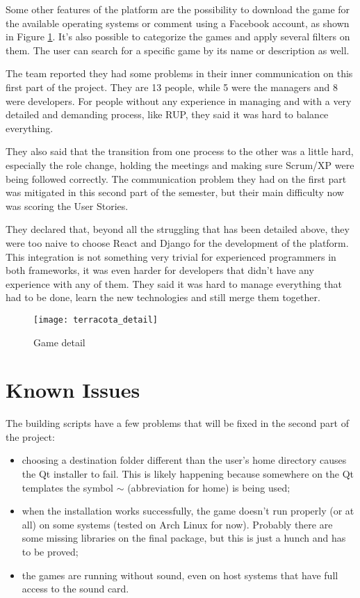 Some other features of the platform are the possibility to download the game for the available operating systems or comment using a Facebook account, as shown in Figure \ref{fig:game_detail}. It's also possible to categorize the games and apply several filters on them. The user can search for a specific game by its name or description as well.

The team reported they had some problems in their inner communication on this first part of the project. They are 13 people, while 5 were the managers and 8 were developers. For people without any experience in managing and with a very detailed and demanding process, like RUP, they said it was hard to balance everything.

They also said that the transition from one process to the other was a little hard, especially the role change, holding the meetings and making sure Scrum/XP were being followed correctly. The communication problem they had on the first part was mitigated in this second part of the semester, but their main difficulty now was scoring the User Stories.

They declared that, beyond all the struggling that has been detailed above, they were too naive to choose React and Django for the development of the platform. This integration is not something very trivial for experienced programmers in both frameworks, it was even harder for developers that didn't have any experience with any of them. They said it was hard to manage everything that had to be done, learn the new technologies and still merge them together.


\begin{figure}[h!]
\centering
\texttt{[image: terracota\_detail]}
\caption{Game detail}
\label {fig:game_detail}
\end{figure}

\section{Known Issues}
\label {sec:issues}

The building scripts have a few problems that will be fixed in the second part of the project:

\begin{itemize}
\item choosing a destination folder different than the user's home directory causes the Qt installer to fail. This is likely happening because somewhere on the Qt templates the symbol $\sim$ (abbreviation for home) is being used;

\item when the installation works successfully, the game doesn't run properly (or at all) on some systems (tested on Arch Linux for now). Probably there are some missing libraries on the final package, but this is just a hunch and has to be proved;

\item the games are running without sound, even on host systems that have full access to the sound card.
\end{itemize}

